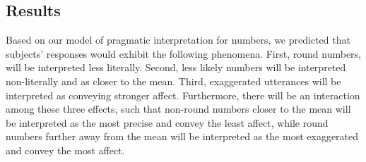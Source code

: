 \documentclass{article} %
\begin{document}
\subsection{Results}

Based on our model of pragmatic interpretation for numbers, we predicted that subjects' responses would exhibit the following phenomena. First, round numbers, will be interpreted less literally. Second, less likely numbers will be interpreted non-literally and as closer to the mean. Third, exaggerated utterances will be interpreted as conveying stronger affect. Furthermore, there will be an interaction among these three effects, such that non-round numbers closer to the mean will be interpreted as the most precise and convey the least affect, while round numbers further away from the mean will be interpreted as the most exaggerated and convey the most affect.


\end{document}
